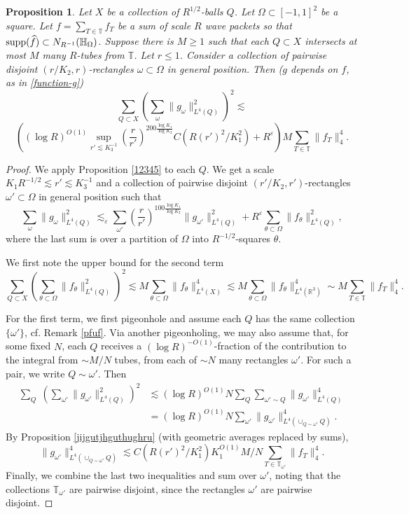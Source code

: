 \documentclass{amsart}%
\numberwithin{equation}{section}
\newtheorem{proposition}[theorem]{Proposition}
\newcommand{\e}{\varepsilon}
\newcommand{\wh}{\widehat}
\newcommand{\ZT}{\mathbb{T}}
\newcommand{\ZH}{\mathbb{H}}
\newcommand{\R}{\mathbb{R}}
\newcommand{\1}{\mathbbm{1}}
\begin{document}
\begin{proposition}
\label{fjgjirtgihiythiuij09u}	
Let $X$ be a collection of $R^{1/2}$-balls $Q$. Let $\Omega\subset [-1,1]^2$ be a square.
Let $f=\sum_{T\in\ZT}f_T$ be a sum of scale $R$ wave packets so that ${\rm supp}(\wh f)\subset N_{R^{-1}}(\ZH_{\Omega})$. 
Suppose there is $M\geq1$ such that each  $Q\subset X$ intersects  at most $ M$ many $R$-tubes from $\ZT$.
Let $r\le 1$. 
Consider a collection of pairwise disjoint $(r/K_2,r)$-rectangles $\omega\subset \Omega$ in general position. 
Then ($g$ depends on $f$, as in \eqref{function-g})	
$$\sum_{Q\subset X}(\sum_{\omega}\|g_{\omega}\|_{L^4(Q)}^2)^{2}\lesssim $$$$\left((\log R)^{O(1)}\sup_{r'\lesssim K_3^{-1}}(\frac{r}{r'})^{200\frac{\log{K_1}}{\log K_2}}C(R(r')^2/K_1^2)+R^\e\right) M\sum_{T\in\ZT}\big\|f_{T}\big\|_4^4.$$

\end{proposition}
\begin{proof}
We apply Proposition \ref{12345} to each $Q$.
We get a scale $K_1R^{-1/2}\lesssim r'\lesssim K_3^{-1}$ and a collection of  pairwise disjoint $(r'/K_2,r')$-rectangles  $\omega'\subset \Omega$ in general position such that 
$$\sum_{\omega}\|g_\omega\|_{L^4({Q})}^2\lesssim_\e \sum_{\omega'}(\frac{r}{r'})^{100\frac{\log{K_1}}{\log K_2}} \|g_{\omega'}\|_{L^4({Q})}^2+R^\e \sum_{\theta\subset \Omega}\|f_{\theta}\|_{L^4(Q)}^2,
$$
where the last sum is over a partition of $\Omega$ into $R^{-1/2}$-squares $\theta$.
\smallskip

We first note the upper bound for the second term
$$\sum_{Q\subset X}(\sum_{\theta\subset \Omega}\|f_{\theta}\|_{L^4({Q})}^2)^2\lesssim M\sum_{\theta\subset \Omega}\|f_{\theta}\|_{L^4({X})}^4\lesssim M\sum_{\theta\subset \Omega}\|f_{\theta}\|_{L^4({\R^3})}^4\sim M\sum_{T\in\ZT}\big\|f_{T}\big\|_4^4.$$
\smallskip

For the first term, we first pigeonhole and assume each $Q$ has the same collection $\{\omega'\}$, cf. Remark \ref{pfuf}. Via another pigeonholing, we  may also assume that, for some fixed $N$,  each $Q$ receives a $(\log R)^{-O(1)}$-fraction of the contribution to the integral from $\sim M/N$ tubes, from each of $\sim N$ many rectangles $\omega'$. For such a pair, we write $Q\sim\omega'$.
Then
\begin{align*}
\sum_{Q}\;(\sum_{\omega'}\|g_{\omega'}\|_{L^4(Q)}^2)^2&\lesssim (\log R)^{O(1)} N\sum_{Q}\sum_{\omega'\sim Q}\|g_{\omega'}\|_{L^4(Q)}^4\\&=(\log R)^{O(1)} N\sum_{\omega'}\|g_{\omega'}\|_{L^4(\cup_{Q\sim\omega'}Q)}^4.
\end{align*}
By Proposition \ref{jijgutjhguthughru} (with geometric averages replaced by sums), $$\|g_{\omega'}\|_{L^4(\cup_{Q\sim\omega'}Q)}^4\lesssim C(R(r')^2/K_1^2) K_1^{O(1)}M/N\sum_{T\in\ZT_{\omega'}}\|f_{T}\big\|_4^4.$$
Finally, we  combine the last two inequalities and sum over $\omega'$, noting that the collections $\ZT_{\omega'}$ are pairwise disjoint, since the rectangles $\omega'$ are pairwise disjoint. \qedhere

\end{proof}
\end{document}
